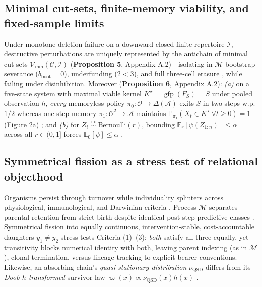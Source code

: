 \documentclass[11pt,letterpaper]{article}
\begin{document}
\subsection{Minimal cut-sets, finite-memory viability, and fixed-sample
limits}\label{minimal-cut-sets-finite-memory-viability-and-fixed-sample-limits}

Under monotone deletion failure on a downward-closed finite repertoire
\(\mathcal{I}\), destructive perturbations are uniquely represented by
the antichain of minimal cut-sets
\(\mathcal{V}_{\min}(\mathcal{C}, \mathcal{I})\) (\textbf{Proposition
5}, Appendix A.2)---isolating in \(\mathcal{M}\) bootstrap severance
(\(b_{\mathrm{boot}}=0\)), underfunding (\(2 < 3\)), and full three-cell
erasure \citep{coverThomas2006}, while failing under disinhibition.
Moreover (\textbf{Proposition 6}, Appendix A.2): \emph{(a)} on a
five-state system with maximal viable kernel
\(K^\star = \operatorname{gfp}(F_S) = S\) under pooled observation
\(h\), \emph{every} memoryless policy
\(\pi_0: \mathcal{O} \to \Delta(\mathcal{A})\) exits \(S\) in two steps
w.p. \(1/2\) whereas one-step memory
\(\pi_1: \mathcal{O}^2 \to \mathcal{A}\) maintains
\(\mathbb{P}_{\pi_1}(X_t \in K^\star\ \forall t \ge 0) = 1\) (Figure 2a)
\citep{kaelbling1998, papadimitriouTsitsiklis1987, sethTsakiris2018};
and \emph{(b)} for
\(Z_i \stackrel{\mathrm{i.i.d.}}{\sim} \mathrm{Bernoulli}(r)\), bounding
\(\mathbb{E}_r[\psi(Z_{1:n})] \le \alpha\) across all \(r \in (0,1]\)
forces \(\mathbb{E}_0[\psi] \le \alpha\) \citep{leCam1973, mayo2018}.

\subsection{Symmetrical fission as a stress test of relational
objecthood}\label{symmetrical-fission-as-a-stress-test-of-relational-objecthood}

Organisms persist through turnover while individuality splinters across
physiological, immunological, and Darwinian criteria
\citep{whitehead1929, clarke2010, godfreySmith2009, pradeu2012, maynardSmithSzathmary1995, dupreNicholson2018}.
Process \(\mathcal{M}\) separates parental retention from strict birth
despite identical post-step predictive classes \citep{wiggins2001}.
Symmetrical fission into equally continuous, intervention-stable,
cost-accountable daughters \(y_1 \neq y_2\) \citep{parfit1984}
stress-tests Criteria (1)--(3): \emph{both} satisfy all three equally,
yet transitivity blocks numerical identity with both, leaving parent
indexing (as in \(\mathcal{M}\)), clonal termination, versus lineage
tracking to explicit bearer conventions. Likewise, an absorbing chain's
\emph{quasi-stationary distribution} \(\nu_{\mathrm{QSD}}\) differs from
its \emph{Doob \(h\)-transformed} survivor law
\(\varpi(x) \propto \nu_{\mathrm{QSD}}(x)h(x)\)
\citep{doob1957, darrochSeneta1965, collet2013, cuciniello2026}.
\end{document}
